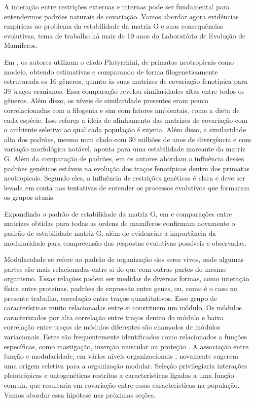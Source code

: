 A interação entre restrições externas e internas pode ser fundamental
para entendermos padrões naturais de covariação. 
Vamos abordar agora evidências empíricas ao problema da estabilidade da
matriz G e suas consequências evolutivas, tema de trabalho há mais de 10
anos do Laboratório de Evolução de Mamíferos. 

Em \cite{Marroig2001}, os autores utilizam o clado Platyrrhini, de
primatas neotropicais como modelo, obtendo estimativas e comparando de
forma filogeneticamente estruturada os 16 gêneros, quanto às suas
matrizes de covariação fenotípica para 39 traços cranianos. 
Essa comparação revelou similaridades altas entre todos os gêneros. 
Além disso, os níveis de similaridade presentes eram pouco
correlacionadas com a filogenia e sim com fatores ambientais, como a
dieta de cada espécie. 
Isso reforça a ideia de alinhamento das matrizes de covariação com o
ambiente seletivo ao qual cada população é sujeita. 
Além disso, a similaridade alta dos padrões, mesmo num clado com 30
milhões de anos de divergência e com variação morfológica notável,
aponta para uma estabilidade marcante da matriz G. 
Além da comparação de padrões, em \cite{Marroig2005, Marroig2010} os
autores abordam a influência desses padrões genéticos estáveis na
evolução dos traços fenotípicos dentro dos primatas neotropicais. 
Segundo eles, a influência de restrições genéticas é clara e deve ser
levada em conta nas tentativas de entender os processos evolutivos que
formaram os grupos atuais. 

Expandindo o padrão de estabilidade da matriz G, em \cite{Porto2008} e
\cite{Marroig2009} comparações entre matrizes obtidas para todas as
ordens de mamíferos confirmam novamente o padrão de estabilidade matriz
G, além de evidenciar a importância da modularidade para compreensão das
respostas evolutivas possíveis e observadas. 

Modularidade se refere ao padrão de organização dos seres vivos, onde
algumas partes são mais relacionadas entre si do que com outras partes
do mesmo organismo. 
Essas relações podem ser medidas de diversas formas, como interação física
entre proteínas, padrões de expressão entre genes, ou, como é o caso
no presente trabalho, correlação entre traços quantitativos. 
Esse grupo de características muito relacionadas entre si constituem um
módulo. 
Os módulos caracterizados por alta correlação entre traços dentro do
módulo e baixa correlação entre traços de módulos diferentes são
chamados de módulos variacionais. 
Estes são frequentemente identificados como relacionados a funções
específicas, como mastigação, inserção muscular ou proteção
\citep{Cheverud1997}. 
A associação entre função e modularidade, em vários níveis
organizacionais \citep{Costanzo2010}, novamente sugerem uma origem
seletiva para a organização modular. 
Seleção privilegiaria interações pleiotrópicas e ontogenéticas restritas
a características ligadas a uma função comum, que resultaria em
covariação entre essas características na população.
Vamos abordar essa hipótese nas próximas seções. 

